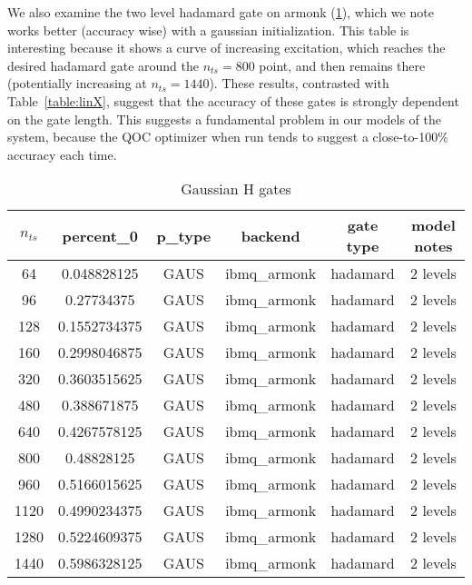 \documentclass[12pt]{article}
\begin{document}
  We also examine the two level hadamard gate on armonk (\ref{table:gausH}),
  which we note works better (accuracy wise) with a gaussian initialization.
  This table is interesting because it shows a curve of increasing excitation,
  which reaches the desired hadamard gate around the $n_{ts}=800$ point, and
  then remains there (potentially increasing at $n_{ts} = 1440$). These results,
  contrasted with Table~\ref{table:linX}, suggest that the accuracy of these gates is strongly dependent on the gate length. This suggests a fundamental problem in our models of the system, because the QOC optimizer when run tends to suggest a close-to-100\% accuracy each time.

\begin{table}
    \begin{tabular}{||c c c c c c||} 
    \hline
    $n_{ts}$ & percent\_0 & p\_type & backend & gate type & model notes\\ [0.5ex] 
    \hline
64 &0.048828125 &GAUS &ibmq\_armonk &hadamard & 2 levels\\
96 &0.27734375 &GAUS &ibmq\_armonk &hadamard &2 levels\\
128 &0.1552734375 &GAUS &ibmq\_armonk &hadamard &2 levels\\
160 &0.2998046875 &GAUS &ibmq\_armonk &hadamard &2 levels\\
320 &0.3603515625 &GAUS &ibmq\_armonk &hadamard &2 levels\\
480 &0.388671875 &GAUS &ibmq\_armonk &hadamard &2 levels\\
640 &0.4267578125 &GAUS &ibmq\_armonk &hadamard &2 levels\\
800 &0.48828125 &GAUS &ibmq\_armonk &hadamard &2 levels\\
960 &0.5166015625 &GAUS &ibmq\_armonk &hadamard &2 levels\\
1120 &0.4990234375 &GAUS &ibmq\_armonk &hadamard &2 levels\\
1280 &0.5224609375 &GAUS &ibmq\_armonk &hadamard &2 levels\\
1440 &0.5986328125 &GAUS &ibmq\_armonk &hadamard &2 levels\\
    \hline
   \end{tabular}
   \caption{Gaussian H gates}
   \label{table:gausH}
\end{table}
\end{document}
